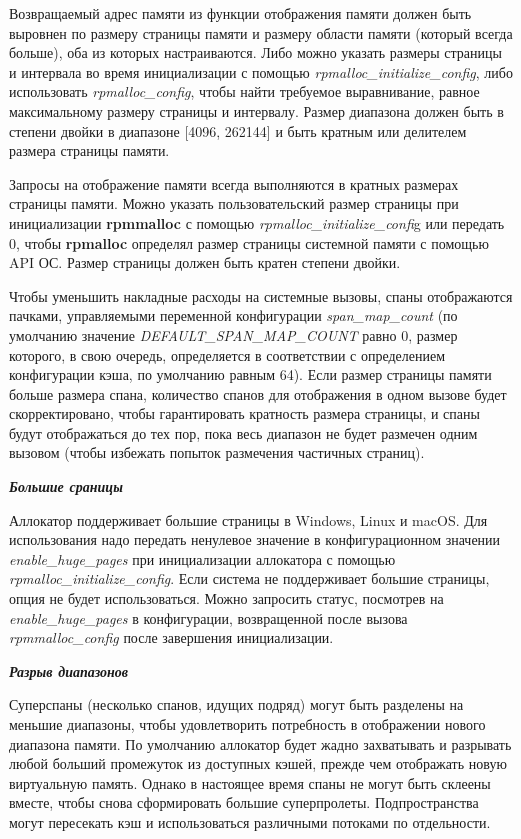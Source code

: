 Возвращаемый адрес памяти из функции отображения памяти должен быть выровнен по размеру страницы памяти и размеру области памяти (который всегда больше), оба из которых настраиваются. Либо можно указать размеры страницы и интервала во время инициализации с помощью \textit{rpmalloc\_initialize\_config}, либо использовать \textit{rpmalloc\_config}, чтобы найти требуемое выравнивание, равное максимальному размеру страницы и интервалу. Размер диапазона должен быть в степени двойки в диапазоне [4096, 262144] и быть кратным или делителем размера страницы памяти.

Запросы на отображение памяти всегда выполняются в кратных размерах страницы памяти. Можно указать пользовательский размер страницы при инициализации \textbf{rpmmalloc} с помощью \textit{rpmalloc\_initialize\_confi}g или передать 0, чтобы \textbf{rpmalloc} определял размер страницы системной памяти с помощью API ОС. Размер страницы должен быть кратен степени двойки.

Чтобы уменьшить накладные расходы на системные вызовы, спаны отображаются пачками, управляемыми переменной конфигурации \textit{span\_map\_count} (по умолчанию значение \textit{DEFAULT\_SPAN\_MAP\_COUNT} равно 0, размер которого, в свою очередь, определяется в соответствии с определением конфигурации кэша, по умолчанию равным 64). Если размер страницы памяти больше размера спана, количество спанов для отображения в одном вызове будет скорректировано, чтобы гарантировать кратность размера страницы, и спаны будут отображаться до тех пор, пока весь диапазон не будет размечен одним вызовом (чтобы избежать попыток размечения частичных страниц).

\bigbreak
\textit{\textbf{Большие сраницы}}

Аллокатор поддерживает большие страницы в Windows, Linux и macOS. Для использования надо передать ненулевое значение в конфигурационном значении \textit{enable\_huge\_pages} при инициализации аллокатора с помощью \textit{rpmalloc\_initialize\_config}. Если система не поддерживает большие страницы, опция не будет использоваться. Можно запросить статус, посмотрев на \textit{enable\_huge\_pages} в конфигурации, возвращенной после вызова \textit{rpmmalloc\_config} после завершения инициализации.

\bigbreak
\textit{\textbf{Разрыв диапазонов}}

Суперспаны (несколько спанов, идущих подряд) могут быть разделены на меньшие диапазоны, чтобы удовлетворить потребность в отображении нового диапазона памяти. По умолчанию аллокатор будет жадно захватывать и разрывать любой больший промежуток из доступных кэшей, прежде чем отображать новую виртуальную память. Однако в настоящее время спаны не могут быть склеены вместе, чтобы снова сформировать большие суперпролеты. Подпространства могут пересекать кэш и использоваться различными потоками по отдельности.

